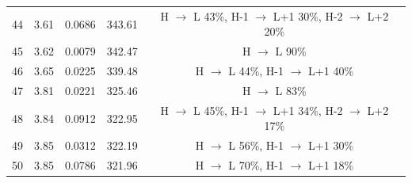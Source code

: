 \begin{table}[H]
{\begin{center}
\begin{tabular}{ccccc}
44 & 3.61 & 0.0686 & 343.61 & H $\rightarrow$ L 43\%, H-1 $\rightarrow$ L+1 30\%, H-2 $\rightarrow$ L+2 20\% \\
45 & 3.62 & 0.0079 & 342.47 & H $\rightarrow$ L 90\% \\
46 & 3.65 & 0.0225 & 339.48 & H $\rightarrow$ L 44\%, H-1 $\rightarrow$ L+1 40\% \\
47 & 3.81 & 0.0221 & 325.46 & H $\rightarrow$ L 83\% \\
48 & 3.84 & 0.0912 & 322.95 & H $\rightarrow$ L 45\%, H-1 $\rightarrow$ L+1 34\%, H-2 $\rightarrow$ L+2 17\% \\
49 & 3.85 & 0.0312 & 322.19 & H $\rightarrow$ L 56\%, H-1 $\rightarrow$ L+1 30\% \\
50 & 3.85 & 0.0786 & 321.96 & H $\rightarrow$ L 70\%, H-1 $\rightarrow$ L+1 18\% \\
\hline
\end{tabular}
\end{center} }
\vspace{-0.2cm}
\end{table} \newpage \noindent

